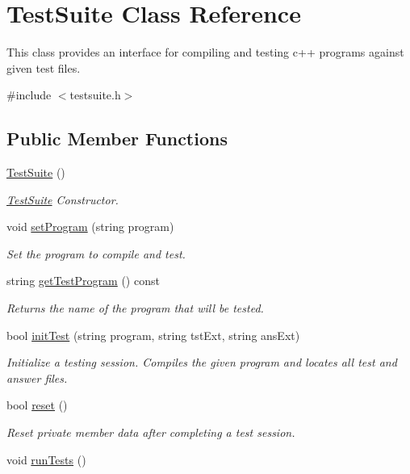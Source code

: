 \hypertarget{class_poly}{\section{Test\-Suite Class Reference}
\label{class_poly}
}


This class provides an interface for compiling and testing c++ programs against given test files.  




{\ttfamily \#include $<$testsuite.\-h$>$}

\subsection*{Public Member Functions}
\begin{DoxyCompactItemize}
\item 
\hypertarget{classTestSuite_af7291e6d8b53443604ee0c1fcf1fadfc}{\hyperlink{classTestSuite_af7291e6d8b53443604ee0c1fcf1fadfc}{Test\-Suite} ()}\label{classTestSuite_af7291e6d8b53443604ee0c1fcf1fadfc}

\begin{DoxyCompactList}\small\item\em \hyperlink{classTestSuite}{Test\-Suite} Constructor. \end{DoxyCompactList}\item 
void \hyperlink{classTestSuite_a42b15cde1c5286cf6702ddb4c866a5c3}{set\-Program} (string program)
\begin{DoxyCompactList}\small\item\em Set the program to compile and test. \end{DoxyCompactList}\item 
string \hyperlink{classTestSuite_aa273f06e0914477c47ddb2b8f3ac55a8}{get\-Test\-Program} () const 
\begin{DoxyCompactList}\small\item\em Returns the name of the program that will be tested. \end{DoxyCompactList}\item 
bool \hyperlink{classTestSuite_ac241e618045fa3124518ca937d235521}{init\-Test} (string program, string tst\-Ext, string ans\-Ext)
\begin{DoxyCompactList}\small\item\em Initialize a testing session. Compiles the given program and locates all test and answer files. \end{DoxyCompactList}\item 
bool \hyperlink{classTestSuite_af4a05adf8a6e68c6ff2254ca2eaf58f0}{reset} ()
\begin{DoxyCompactList}\small\item\em Reset private member data after completing a test session. \end{DoxyCompactList}\item 
\hypertarget{classTestSuite_afc3da0509c600ecf311ea5642b498c0a}{void \hyperlink{classTestSuite_afc3da0509c600ecf311ea5642b498c0a}{run\-Tests} ()}\label{classTestSuite_afc3da0509c600ecf311ea5642b498c0a}


\end{DoxyCompactItemize}
